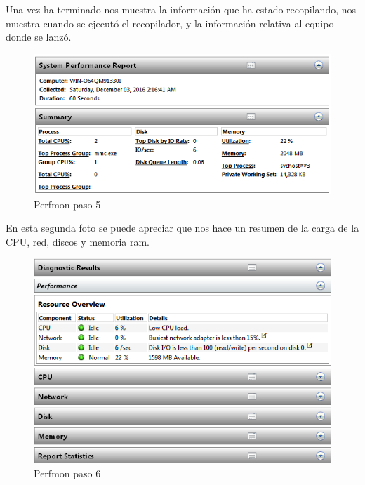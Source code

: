 Una vez ha terminado nos muestra la información que ha estado recopilando, nos muestra cuando se ejecutó el recopilador, y la información relativa al equipo donde se lanzó.

\begin{figure}[H] %
	\centering
	\includegraphics[scale=0.5]{pics/perfmon5.png}  %
	\caption{Perfmon paso 5} \label{fig:perfmon5}
\end{figure}

En esta segunda foto se puede apreciar que nos hace un resumen de la carga de la CPU, red, discos y memoria ram.

\begin{figure}[H] %
	\centering
	\includegraphics[scale=0.5]{pics/perfmon6.png}  %
	\caption{Perfmon paso 6} \label{fig:perfmon6}
\end{figure}

